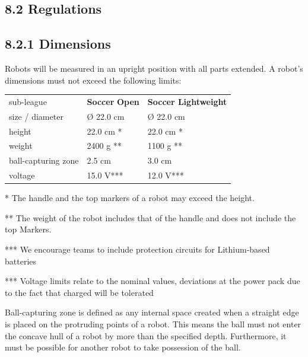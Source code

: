 \documentclass{article}
\begin{document}
\subsection{8.2 Regulations \label{ref-054}}

\subsection{8.2.1 Dimensions \label{ref-055}}

Robots will be measured in an upright position with all parts extended. A robot's dimensions must not exceed the following limits:

\begin{table}
\begin{tabularx}{\textwidth}{
p{}
p{}
p{}}
sub-league & \textbf{\textcolor{color-5}{Soccer}} \textbf{Open} & \textbf{\textcolor{color-5}{Soccer Lightweight}} \\
size / diameter & \O{} 22.0 cm & \O{} 22.0 cm \\
height & 22.0 cm * & 22.0 cm * \\
weight & 2400 g ** & 1100 g ** \\
ball-capturing zone & \textcolor{color-5}{2.5 cm} & 3.0 cm \\
voltage & 15.0 V\textcolor{color-5}{***} & 12.0 V\textcolor{color-5}{***} \\

\end{tabularx}

\end{table}

* The handle and the top markers of a robot may exceed the height. 

** The weight of the robot includes that of the handle and does not include the top Markers.

*** We encourage teams to include protection circuits for Lithium-based batteries

*** Voltage limits relate to the nominal values, deviations at the power pack due to the fact that charged will be tolerated

Ball-capturing zone is defined as any internal space created when a straight edge is placed on the protruding points of a robot. This means the ball must not enter the concave hull of a robot by more than the specified depth. Furthermore, it must be possible for another robot to take possession of the ball.
\end{document}
